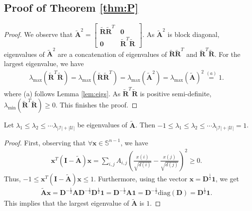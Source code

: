 \documentclass[sigconf]{acmart}
\begin{document}
\subsection{Proof of Theorem \ref{thm:P}}
\begin{proof}
We observe that $\tilde{\bm{A}}^2 = \begin{bmatrix}
    \tilde{\bm{R}}\tilde{\bm{R}}^T & \bm{0} \\
    \bm{0} & \tilde{\bm{R}}^T\tilde{\bm{R}}
    \end{bmatrix}$.
As $\tilde{\bm{A}}^2$ is block diagonal, eigenvalues of $\tilde{\bm{A}}^2$ are a concatenation of eigenvalues of $\tilde{\bm{R}}\tilde{\bm{R}}^T$ and $\tilde{\bm{R}}^T\tilde{\bm{R}}$. For the largest eigenvalue, we have 
\begin{align*}
    \lambda_{\max} (\tilde{\bm{R}}^T\tilde{\bm{R}}) = \lambda_{\max} (\tilde{\bm{R}}\tilde{\bm{R}}^T) = \lambda_{\max}(\tilde{\bm{A}}^2) = \lambda_{\max}(\tilde{\bm{A}})^2 \overset{(a)}{=} 1.
\end{align*}
where (a) follows Lemma \ref{lem:eigs}. As $\tilde{\bm{R}}^T\tilde{\bm{R}}$ is positive semi-definite, $\lambda_{\min}(\tilde{\bm{R}}^T\tilde{\bm{R}}) \geq 0$. This finishes the proof.
\end{proof}

\begin{lemma} \label{lem:eigs}
    Let $\lambda_1 \leq \lambda_2 \leq \cdots \lambda_{|\mathcal{I}| + |\mathcal{U}|}$ be eigenvalues of $\tilde{\bm{A}}$. Then $-1 \leq \lambda_1 \leq \lambda_2 \leq \cdots \lambda_{|\mathcal{I}| + |\mathcal{U}|} = 1$.
\end{lemma}
\begin{proof}
First, observing that $\forall \bm{x} \in \mathbb{S}^{n-1}$, we have
\begin{align*}
    \bm{x}^T(\bm{I} - \tilde{\bm{A}})\bm{x} = \sum_{i,j} A_{i,j} \left(\frac{x(i)}{\sqrt{d(i)}} - \frac{x(j)}{\sqrt{d(j)}} \right)^2 \geq 0.
\end{align*}
Thus, $-1 \leq \bm{x}^T(\bm{I} - \tilde{\bm{A}})\bm{x} \leq 1$. Furthermore, using the vector $\bm{x} = \bm{D}^{\frac{1}{2}}\bm{1}$, we get 
\begin{align*}
    \tilde{\bm{A}} \bm{x} = \bm{D}^{-\frac{1}{2}}\bm{A}\bm{D}^{-\frac{1}{2}} \bm{D}^{\frac{1}{2}} \bm{1} = \bm{D}^{-\frac{1}{2}}\bm{A} \bm{1} = \bm{D}^{-\frac{1}{2}} \text{diag}(\bm{D}) = \bm{D}^{\frac{1}{2}}\bm{1}.
\end{align*}
This implies that the largest eigenvalue of $\tilde{\bm{A}}$ is $1$.
\end{proof}





\end{document}
